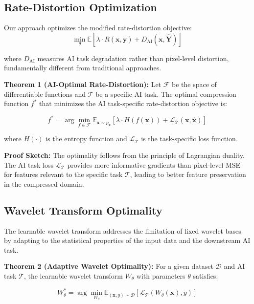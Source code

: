 \documentclass[conference]{IEEEtran}
\begin{document}
\subsection{Rate-Distortion Optimization}

Our approach optimizes the modified rate-distortion objective:
\begin{equation}
\min_{\theta} \mathbb{E}[\lambda \cdot R(\mathbf{x}, \hat{\mathbf{y}}) + D_{\text{AI}}(\mathbf{x}, \hat{\mathbf{Y}})]
\end{equation}

where $D_{\text{AI}}$ measures AI task degradation rather than pixel-level distortion, fundamentally different from traditional approaches.

\textbf{Theorem 1 (AI-Optimal Rate-Distortion):} Let $\mathcal{F}$ be the space of differentiable functions and $\mathcal{T}$ be a specific AI task. The optimal compression function $f^*$ that minimizes the AI task-specific rate-distortion objective is:

\begin{equation}
f^* = \arg\min_{f \in \mathcal{F}} \mathbb{E}_{\mathbf{x} \sim p_{\mathbf{x}}}[\lambda \cdot H(f(\mathbf{x})) + \mathcal{L}_{\mathcal{T}}(\mathbf{x}, \hat{\mathbf{x}})]
\end{equation}

where $H(\cdot)$ is the entropy function and $\mathcal{L}_{\mathcal{T}}$ is the task-specific loss function.

\textbf{Proof Sketch:} The optimality follows from the principle of Lagrangian duality. The AI task loss $\mathcal{L}_{\mathcal{T}}$ provides more informative gradients than pixel-level MSE for features relevant to the specific task $\mathcal{T}$, leading to better feature preservation in the compressed domain.

\subsection{Wavelet Transform Optimality}

The learnable wavelet transform addresses the limitation of fixed wavelet bases by adapting to the statistical properties of the input data and the downstream AI task.

\textbf{Theorem 2 (Adaptive Wavelet Optimality):} For a given dataset $\mathcal{D}$ and AI task $\mathcal{T}$, the learnable wavelet transform $W_{\theta}$ with parameters $\theta$ satisfies:

\begin{equation}
W_{\theta}^* = \arg\min_{W_{\theta}} \mathbb{E}_{(\mathbf{x}, y) \sim \mathcal{D}}[\mathcal{L}_{\mathcal{T}}(W_{\theta}(\mathbf{x}), y)]
\end{equation}
\end{document}
